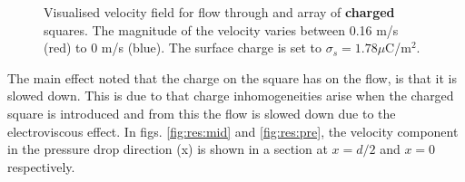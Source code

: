 \begin{figure}
  \centering
  \hspace{5pt} 
  \caption{Visualised velocity field for flow through and array of
    \textbf{charged} squares. The magnitude of the velocity varies
    between 0.16 m/s (red) to 0 m/s (blue). The surface charge is set
    to $\sigma_s = 1.78 \mu$C/m$^2$.}
  \label{fig:res:s_charged}
\end{figure}

The main effect noted that the charge on the square has on the flow,
is that it is slowed down. This is due to that charge inhomogeneities
arise when the charged square is introduced and from this the flow is
slowed down due to the electroviscous effect. In
figs. \ref{fig:res:mid} and \ref{fig:res:pre}, the velocity component
in the pressure drop direction (x) is shown in a section at $x = d/2$
and $x = 0$ respectively.  

